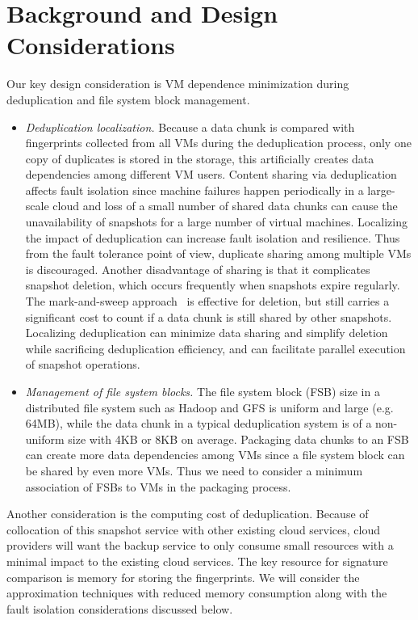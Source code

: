 \section{Background and Design Considerations}
\label{data:options}
Our key design consideration is VM dependence minimization during deduplication 
and file system block management.
\begin{itemize}
\item {\em Deduplication localization.}
Because a data chunk is compared with fingerprints collected from all VMs during
the deduplication process, only one copy of duplicates is stored in the storage,
this artificially creates data dependencies among different VM users. 
Content sharing via deduplication affects fault isolation since machine failures happen periodically 
in a large-scale cloud and
loss of a small number of shared data chunks can 
cause the unavailability of snapshots for a large number of virtual machines.
Localizing the impact of deduplication can increase fault isolation and resilience.
Thus from the fault tolerance point of view,  duplicate sharing among multiple VMs is 
discouraged. 
Another disadvantage of sharing is that it complicates snapshot deletion, 
which  occurs frequently when snapshots expire regularly. 
The mark-and-sweep approach~\cite{Guo2011,Fabiano2013}  is effective for deletion, but still carries a significant cost
to count if a data chunk is still shared by other snapshots. 
Localizing deduplication can  minimize data sharing and simplify deletion while sacrificing 
deduplication efficiency, and  can facilitate parallel execution of snapshot operations.
\item{\em  Management of file system blocks.}
The file system block (FSB) size in a distributed file system such as  Hadoop and GFS is uniform and large (e.g.  64MB),
while the data chunk in a typical deduplication system is of a non-uniform size with 4KB or 8KB on average.
Packaging data chunks to an FSB can create more data dependencies among VMs
since a file system block can be shared by even more VMs.
Thus we need to consider a minimum association of FSBs to VMs in the packaging process.
\end{itemize}

Another consideration is the computing cost of deduplication.
Because of collocation of this snapshot service with other existing cloud services, 
cloud providers will want the backup service to only consume small resources
with a minimal impact to the existing cloud services.
The key resource for signature comparison  is memory for storing the fingerprints. 
We will consider the approximation techniques with reduced memory consumption along 
with the fault isolation considerations discussed below. 

